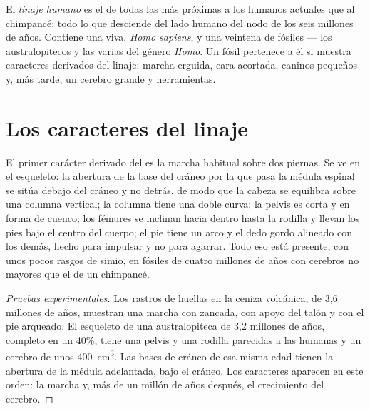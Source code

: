 \begin{definition}\label{def:g12:human-evolution:lineage}
El \emph{linaje humano} es el  de todas las
 más próximas a los humanos actuales que al chimpancé: todo lo
que desciende del lado humano del nodo de los seis millones de años.
Contiene una  viva, \emph{Homo sapiens}, y una veintena de
 fósiles --- los australopitecos y las varias  del
género \emph{Homo}. Un fósil pertenece a él si muestra caracteres
derivados del linaje: marcha erguida, cara acortada, caninos pequeños
y, más tarde, un cerebro grande y herramientas.
\end{definition}

\section{Los caracteres del linaje}

\begin{proposition}\label{prop:g12:human-evolution:bipedalism}
El primer carácter derivado del  es la marcha habitual
sobre dos piernas. Se ve en el esqueleto: la abertura de la base del
cráneo por la que pasa la médula espinal se sitúa debajo del cráneo y
no detrás, de modo que la cabeza se equilibra sobre una columna
vertical; la columna tiene una doble curva; la pelvis es corta y en
forma de cuenco; los fémures se inclinan hacia dentro hasta la rodilla
y llevan los pies bajo el centro del cuerpo; el pie tiene un arco y el
dedo gordo alineado con los demás, hecho para impulsar y no para
agarrar. Todo eso está presente, con unos pocos rasgos de simio, en
fósiles de cuatro millones de años con cerebros no mayores que el de un
chimpancé.
\end{proposition}
\begin{proof}[Pruebas experimentales]
Los rastros de huellas en la ceniza volcánica, de 3,6 millones de años,
muestran una marcha con zancada, con apoyo del talón y con el pie
arqueado. El esqueleto de una australopiteca de 3,2 millones de años,
completo en un 40\%, tiene una pelvis y una rodilla parecidas a las
humanas y un cerebro de unos \qty{400}{cm^3}. Las bases de cráneo de
esa misma edad tienen la abertura de la médula adelantada, bajo el
cráneo. Los caracteres aparecen en este orden: la marcha y, más de un
millón de años después, el crecimiento del cerebro.
\end{proof}


